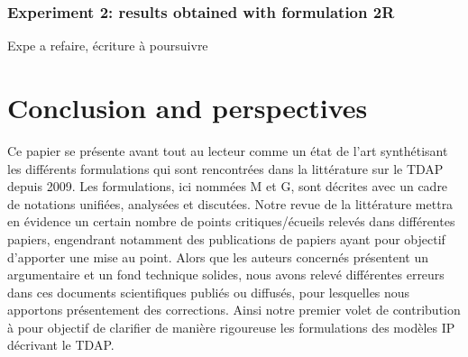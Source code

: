 \documentclass[preprint,12pt,authoryear]{elsarticle}
\begin{document}
%
%
\subsubsection{Experiment 2: results obtained with formulation 2R}\label{sec:res2R}

\color{red}
Expe a refaire, écriture à poursuivre
\color{black}

%
%
\section{Conclusion and perspectives} 
\label{sec:ConclusionPerspectives}

\color{red}
Ce papier se présente avant tout au lecteur comme un état de l’art synthétisant  les différents formulations qui sont rencontrées dans la littérature sur le TDAP depuis 2009. 
Les formulations, ici nommées M et G, sont décrites avec un cadre de notations unifiées, analysées et discutées.
%
Notre revue de la littérature mettra en évidence un certain nombre de points critiques/écueils relevés dans différentes papiers, engendrant notamment des publications de papiers  ayant pour objectif d'apporter une mise au point.
Alors que les auteurs concernés présentent un argumentaire et un fond technique solides, nous avons relevé différentes erreurs dans ces documents scientifiques publiés ou diffusés, pour lesquelles nous apportons présentement des corrections.
Ainsi notre premier volet de contribution à pour objectif de clarifier de manière rigoureuse les formulations des modèles IP décrivant le TDAP.
\end{document}

